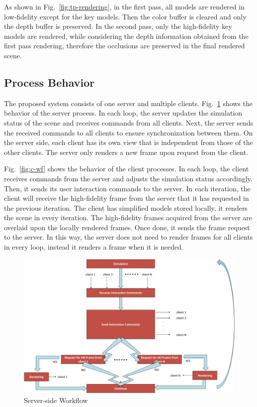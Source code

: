As shown in Fig.~\ref{fig:tp-rendering}, in the first pass, all models are rendered in low-fidelity except for the key models. Then the color buffer is cleared and only the depth buffer is preserved. In the second pass, only the high-fidelity key models are rendered, while considering the depth information obtained from the first pass rendering, therefore the occlusions are preserved in the final rendered scene.

\subsection{Process Behavior}

The proposed system consists of one server and multiple clients.
Fig.~\ref{fig:s-wf} shows the behavior of the server process.
In each loop, the server updates the simulation status of the scene and receives commands from all clients.
Next, the server sends the received commands to all clients to ensure synchronization between them.
On the server side, each client has its own view that is independent from those of the other clients.
The server only renders a new frame upon request from the client.

Fig.~\ref{fig:c-wf} shows the behavior of the client processes. In each loop, the client receives commands from the server and adjusts the simulation status accordingly. Then, it sends its user interaction commands to the server. In each iteration, the client will receive the high-fidelity frame from the server that it has requested in the previous iteration. The client has simplified models stored locally, it renders the scene in every iteration. The high-fidelity frames acquired from the server are overlaid upon the locally rendered frames. Once done, it sends the frame request to the server. In this way, the server does not need to render frames for all clients in every loop, instead it renders a frame when it is needed.

\begin{figure}[!htbp]
	\includegraphics[width=\textwidth]{figures/workflow_server-eps-converted-to.pdf}
	\caption{Server-side Workflow}
	\label{fig:s-wf}
\end{figure}

